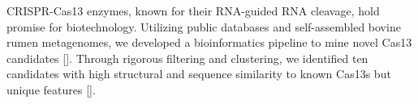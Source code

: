 \documentclass[12pt]{article}
\begin{document}






CRISPR-Cas13 enzymes, known for their RNA-guided RNA cleavage, hold promise for biotechnology. Utilizing public databases and self-assembled bovine rumen metagenomes, we developed a bioinformatics pipeline to mine novel Cas13 candidates [\cite{hu2022}]. Through rigorous filtering and clustering, we identified ten candidates with high structural and sequence similarity to known Cas13s but unique features [\cite{hu2022}].  
  
\end{document}
